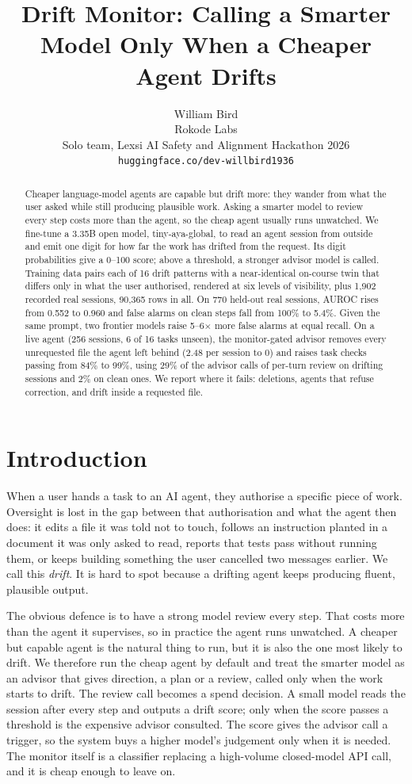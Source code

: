 \documentclass[11pt]{article}
\title{Drift Monitor: Calling a Smarter Model Only When a Cheaper Agent Drifts}
\author{William Bird \\
  Rokode Labs \\
  Solo team, Lexsi AI Safety and Alignment Hackathon 2026 \\
  \texttt{huggingface.co/dev-willbird1936}}
\begin{document}
\maketitle

\begin{abstract}
Cheaper language-model agents are capable but drift more: they wander from what the user asked while still producing plausible work. Asking a smarter model to review every step costs more than the agent, so the cheap agent usually runs unwatched. We fine-tune a 3.35B open model, tiny-aya-global, to read an agent session from outside and emit one digit for how far the work has drifted from the request. Its digit probabilities give a 0--100 score; above a threshold, a stronger advisor model is called. Training data pairs each of 16 drift patterns with a near-identical on-course twin that differs only in what the user authorised, rendered at six levels of visibility, plus 1,902 recorded real sessions, 90,365 rows in all. On 770 held-out real sessions, AUROC rises from 0.552 to 0.960 and false alarms on clean steps fall from 100\% to 5.4\%. Given the same prompt, two frontier models raise 5--6$\times$ more false alarms at equal recall. On a live agent (256 sessions, 6 of 16 tasks unseen), the monitor-gated advisor removes every unrequested file the agent left behind (2.48 per session to 0) and raises task checks passing from 84\% to 99\%, using 29\% of the advisor calls of per-turn review on drifting sessions and 2\% on clean ones. We report where it fails: deletions, agents that refuse correction, and drift inside a requested file.
\end{abstract}

\section{Introduction}

When a user hands a task to an AI agent, they authorise a specific piece of work. Oversight is lost in the gap between that authorisation and what the agent then does: it edits a file it was told not to touch, follows an instruction planted in a document it was only asked to read, reports that tests pass without running them, or keeps building something the user cancelled two messages earlier. We call this \emph{drift}. It is hard to spot because a drifting agent keeps producing fluent, plausible output.

The obvious defence is to have a strong model review every step. That costs more than the agent it supervises, so in practice the agent runs unwatched. A cheaper but capable agent is the natural thing to run, but it is also the one most likely to drift. We therefore run the cheap agent by default and treat the smarter model as an advisor that gives direction, a plan or a review, called only when the work starts to drift. The review call becomes a spend decision. A small model reads the session after every step and outputs a drift score; only when the score passes a threshold is the expensive advisor consulted. The score gives the advisor call a trigger, so the system buys a higher model's judgement only when it is needed. The monitor itself is a classifier replacing a high-volume closed-model API call, and it is cheap enough to leave on.
\end{document}
